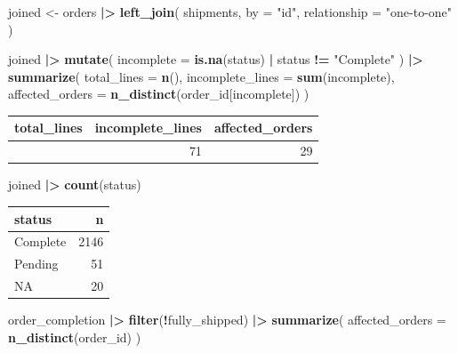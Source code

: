 \documentclass[
]{article}
\newenvironment{Shaded}{\begin{snugshade}}{\end{snugshade}}
\newcommand{\AttributeTok}[1]{\textcolor[rgb]{0.13,0.29,0.53}{#1}}
\newcommand{\FunctionTok}[1]{\textcolor[rgb]{0.13,0.29,0.53}{\textbf{#1}}}
\newcommand{\NormalTok}[1]{#1}
\newcommand{\OtherTok}[1]{\textcolor[rgb]{0.56,0.35,0.01}{#1}}
\newcommand{\SpecialCharTok}[1]{\textcolor[rgb]{0.81,0.36,0.00}{\textbf{#1}}}
\newcommand{\StringTok}[1]{\textcolor[rgb]{0.31,0.60,0.02}{#1}}
\newcounter{none} %
\begin{document}
\begin{Shaded}
\begin{Highlighting}[]
\NormalTok{joined }\OtherTok{\textless{}{-}}\NormalTok{ orders }\SpecialCharTok{|\textgreater{}}
  \FunctionTok{left\_join}\NormalTok{(}
\NormalTok{    shipments,}
    \AttributeTok{by =} \StringTok{"id"}\NormalTok{,}
    \AttributeTok{relationship =} \StringTok{"one{-}to{-}one"}
\NormalTok{  )}

\NormalTok{joined }\SpecialCharTok{|\textgreater{}}
  \FunctionTok{mutate}\NormalTok{(}
    \AttributeTok{incomplete =} \FunctionTok{is.na}\NormalTok{(status) }\SpecialCharTok{|}\NormalTok{ status }\SpecialCharTok{!=} \StringTok{"Complete"}
\NormalTok{  ) }\SpecialCharTok{|\textgreater{}}
  \FunctionTok{summarize}\NormalTok{(}
    \AttributeTok{total\_lines =} \FunctionTok{n}\NormalTok{(),}
    \AttributeTok{incomplete\_lines =} \FunctionTok{sum}\NormalTok{(incomplete),}
    \AttributeTok{affected\_orders =} \FunctionTok{n\_distinct}\NormalTok{(order\_id[incomplete])}
\NormalTok{  )}
\end{Highlighting}
\end{Shaded}

{\def\LTcaptype{none} %
\begin{longtable}[]{@{}rrr@{}}
\toprule\noalign{}
total\_lines & incomplete\_lines & affected\_orders \\
\midrule\noalign{}
\endhead
\bottomrule\noalign{}
\endlastfoot
2217 & 71 & 29 \\
\end{longtable}
}

\begin{Shaded}
\begin{Highlighting}[]
\NormalTok{joined }\SpecialCharTok{|\textgreater{}}
  \FunctionTok{count}\NormalTok{(status)}
\end{Highlighting}
\end{Shaded}

{\def\LTcaptype{none} %
\begin{longtable}[]{@{}lr@{}}
\toprule\noalign{}
status & n \\
\midrule\noalign{}
\endhead
\bottomrule\noalign{}
\endlastfoot
Complete & 2146 \\
Pending & 51 \\
NA & 20 \\
\end{longtable}
}

\begin{Shaded}
\begin{Highlighting}[]
\NormalTok{order\_completion }\SpecialCharTok{|\textgreater{}}
  \FunctionTok{filter}\NormalTok{(}\SpecialCharTok{!}\NormalTok{fully\_shipped) }\SpecialCharTok{|\textgreater{}}
  \FunctionTok{summarize}\NormalTok{(}
    \AttributeTok{affected\_orders =} \FunctionTok{n\_distinct}\NormalTok{(order\_id)}
\NormalTok{  )}
\end{Highlighting}
\end{Shaded}
\end{document}
